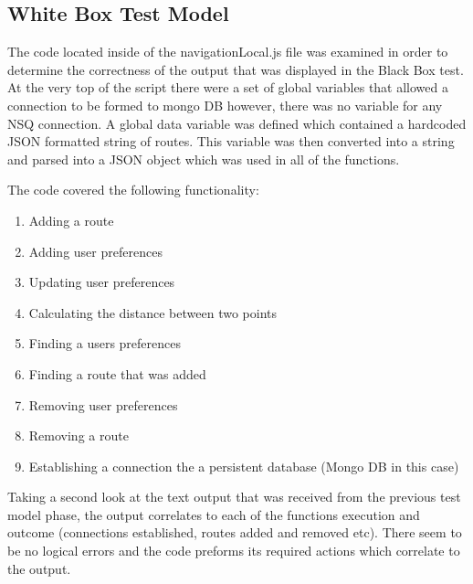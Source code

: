\subsection{White Box Test Model}

The code located inside of the navigationLocal.js file was examined in order to determine the correctness of the output that was displayed in the Black Box test.
At the very top of the script there were a set of global variables that allowed a connection to be formed to mongo DB however, there was no variable for any NSQ connection.
A global data variable was defined which contained a hardcoded JSON formatted string of routes. This variable was then converted into a string and parsed into a JSON object which was used in all of the functions.


The code covered the following functionality:
\begin{enumerate}
\item Adding a route
\item Adding user preferences
\item Updating user preferences
\item Calculating the distance between two points
\item Finding a users preferences
\item Finding a route that was added
\item Removing user preferences
\item Removing a route
\item Establishing a connection the a persistent database (Mongo DB in this case)
\end{enumerate}


Taking a second look at the text output that was received from the previous test model phase, the output correlates to each of the functions execution and outcome
(connections established, routes added and removed etc).
There seem to be no logical errors and the code preforms its required actions which correlate to the output.
